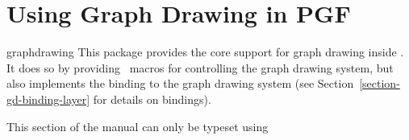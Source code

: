 %
%
%


\section{Using Graph Drawing in PGF}
\label{section-gd-pgf}

{}

\begin{purepgflibrary}{graphdrawing}
    This package provides the core support for graph drawing inside \pgfname.
    It does so by providing \pgfname\ macros for controlling the graph drawing
    system, but also implements the binding to the graph drawing system (see
    Section~\ref{section-gd-binding-layer} for details on bindings).
\end{purepgflibrary}

\ifluatex
\else
    This section of the manual can only be typeset using 
    \expandafter\endinput
\fi


\subsection{Overview}

Just like everywhere else in \pgfname, \tikzname\ is ``just a convenient
syntax'' in the context of graph drawing. The ``hard work'' of binding the
internal representations of nodes and edges with the graph drawing system
written in Lua is not done by \tikzname, but rather by a set of macros that are
part of the basic \pgfname\ layer.

The documentation of the \pgfname\ part of the graph drawing system that is
presented in the following includes only those macros that other \TeX\ packages
could conceivably call in order to use the graph drawing system without using
\tikzname; for instance, for efficiency reasons. (The internal callback
functions defined in the |graphdrawing| library that are part of the binding
between \pgfname\ and the graph drawing system are not documented, should not
be called, and may change in the future.)


